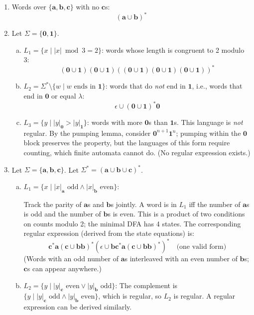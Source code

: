 \begin{enumerate}[{6.}1.]
\item Words over $\{\pmb{a},\pmb{b},\pmb{c}\}$ with no $\pmb{c}$s:
\[
  (\pmb{a}\cup\pmb{b})^*
\]

\item Let $\Sigma=\{\pmb{0},\pmb{1}\}$.

\begin{enumerate}[(a)]
  \item $L_1=\{x\mid|x|\bmod 3=2\}$: words whose length is congruent to 2 modulo 3:
  \[
    (\pmb{0}\cup\pmb{1})(\pmb{0}\cup\pmb{1})((\pmb{0}\cup\pmb{1})(\pmb{0}\cup\pmb{1})(\pmb{0}\cup\pmb{1}))^*
  \]

  \item $L_2=\Sigma^*\setminus\{w\mid w\text{ ends in }\pmb{1}\}$: words that do \emph{not} end in $\pmb{1}$, i.e., words that end in $\pmb{0}$ or equal $\lambda$:
  \[
    \epsilon\cup(\pmb{0}\cup\pmb{1})^*\pmb{0}
  \]

  \item $L_3=\{y\mid|y|_{\pmb{0}}>|y|_{\pmb{1}}\}$: words with more $\pmb{0}$s than $\pmb{1}$s.  This language is \emph{not} regular.  By the pumping lemma, consider $\pmb{0}^{n+1}\pmb{1}^n$; pumping within the $\pmb{0}$ block preserves the property, but the languages of this form require counting, which finite automata cannot do.  (No regular expression exists.)
\end{enumerate}

\item Let $\Sigma=\{\pmb{a},\pmb{b},\pmb{c}\}$.  Let $\Sigma^*=(\pmb{a}\cup\pmb{b}\cup\pmb{c})^*$.

\begin{enumerate}[(a)]
  \item $L_1=\{x\mid|x|_{\pmb{a}}\text{ odd}\wedge|x|_{\pmb{b}}\text{ even}\}$:

  Track the parity of $\pmb{a}$s and $\pmb{b}$s jointly.  A word is in $L_1$ iff the number of $\pmb{a}$s is odd and the number of $\pmb{b}$s is even.  This is a product of two conditions on counts modulo 2; the minimal DFA has 4 states.  The corresponding regular expression (derived from the state equations) is:
  \[
    \pmb{c}^*\pmb{a}(\pmb{c}\cup\pmb{bb})^*(\epsilon\cup\pmb{b}\pmb{c}^*\pmb{a}(\pmb{c}\cup\pmb{bb})^*)^*
    \quad\text{(one valid form)}
  \]
  (Words with an odd number of $\pmb{a}$s interleaved with an even number of $\pmb{b}$s; $\pmb{c}$s can appear anywhere.)

  \item $L_2=\{y\mid|y|_{\pmb{c}}\text{ even}\vee|y|_{\pmb{b}}\text{ odd}\}$:
  The complement is $\{y\mid|y|_{\pmb{c}}\text{ odd}\wedge|y|_{\pmb{b}}\text{ even}\}$, which is regular, so $L_2$ is regular.  A regular expression can be derived similarly.


\end{enumerate}
\end{enumerate}
